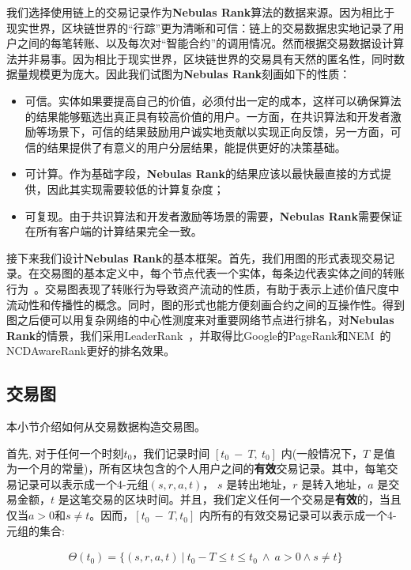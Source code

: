 我们选择使用链上的交易记录作为\textbf{Nebulas Rank}算法的数据来源。因为相比于现实世界，区块链世界的“行踪”更为清晰和可信：链上的交易数据忠实地记录了用户之间的每笔转账、以及每次对“智能合约”的调用情况。然而根据交易数据设计算法并非易事。因为相比于现实世界，区块链世界的交易具有天然的匿名性，同时数据量规模更为庞大。因此我们试图为\textbf{Nebulas Rank}刻画如下的性质：
\begin{itemize}
	\item 可信。实体如果要提高自己的价值，必须付出一定的成本，这样可以确保算法的结果能够甄选出真正具有较高价值的用户。一方面，在共识算法和开发者激励等场景下，可信的结果鼓励用户诚实地贡献以实现正向反馈，另一方面，可信的结果提供了有意义的用户分层结果，能提供更好的决策基础。
	\item 可计算。作为基础字段，\textbf{Nebulas Rank}的结果应该以最快最直接的方式提供，因此其实现需要较低的计算复杂度；
	\item 可复现。由于共识算法和开发者激励等场景的需要，\textbf{Nebulas Rank}需要保证在所有客户端的计算结果完全一致。
\end{itemize}

接下来我们设计\textbf{Nebulas Rank}的基本框架。首先，我们用图的形式表现交易记录。在交易图的基本定义中，每个节点代表一个实体，每条边代表实体之间的转账行为~\cite{Tschorsch2015}。交易图表现了转账行为导致资产流动的性质，有助于表示上述价值尺度中流动性和传播性的概念。同时，图的形式也能方便刻画合约之间的互操作性。得到图之后便可以用复杂网络的中心性测度来对重要网络节点进行排名，对\textbf{Nebulas Rank}的情景，我们采用LeaderRank~\cite{Chen2013}\cite{Li2014}，并取得比Google的PageRank和NEM~\cite{nem}的NCDAwareRank更好的排名效果。

\subsection{交易图} \label{subsec:txg}
本小节介绍如何从交易数据构造交易图。

首先, 对于任何一个时刻$t_0$，我们记录时间 $[t_0\ −\ T,\ t_0]$ 内(一般情况下，$T$ 是值为一个月的常量)，所有区块包含的个人用户之间的\textbf{有效}交易记录。其中，每笔交易记录可以表示成一个4-元组$(s,r,a,t)$， $s$ 是转出地址，$r$ 是转入地址，$a$ 是交易金额，$t$ 是这笔交易的区块时间。并且，我们定义任何一个交易是\textbf{有效}的，当且仅当$a > 0$和$s \neq t$。因而，$[t_0\ −\ T, t_0]$ 内所有的有效交易记录可以表示成一个4-元组的集合:

\begin{align}
\Theta(t_0) = \{(s, r, a, t)\ |\ t_0 - T \le t \le t_0\ \land \ a > 0 \land s \neq t \}
\end{align}

